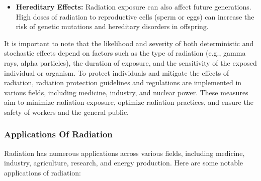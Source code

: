 \documentclass[../introduction.tex]{subfiles}
\begin{document}
\begin{enumerate}
\begin{itemize}
                \item \textbf{Hereditary Effects:} Radiation exposure can also affect future generations. High doses of radiation to 
                reproductive cells (sperm or eggs) can increase the risk of genetic mutations and hereditary disorders in offspring.

            \end{itemize}
        \end{enumerate}

        It is important to note that the likelihood and severity of both deterministic and stochastic effects depend on factors such as the 
        type of radiation (e.g., gamma rays, alpha particles), the duration of exposure, and the sensitivity of the exposed individual or organism.
        To protect individuals and mitigate the effects of radiation, radiation protection guidelines and regulations are implemented 
        in various fields, including medicine, industry, and nuclear power. These measures aim to minimize radiation exposure, optimize radiation 
        practices, and ensure the safety of workers and the general public.

    \subsubsection*{\large Applications Of Radiation}
        Radiation has numerous applications across various fields, including medicine, industry, agriculture, research, and energy production. 
        Here are some notable applications of radiation:
        
\end{document}
